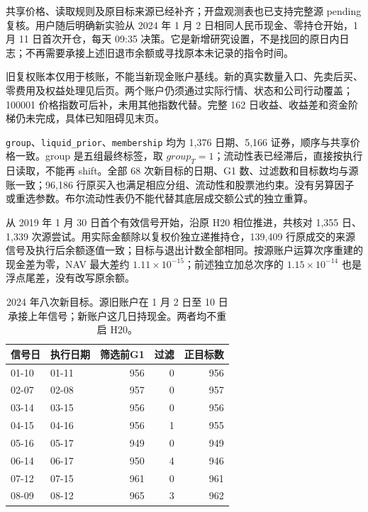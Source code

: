共享价格、读取规则及原目标来源已经补齐；开盘观测表也已支持完整源 pending 复核。用户随后明确新实验从 2024 年 1 月 2 日相同人民币现金、零持仓开始，1 月 11 日首次开仓，每天 09:35 决策。它是新增研究设置，不是找回的原日内日志；不再需要承接上述旧退市余额或寻找原本未记录的指令时间。

旧复权账本仅用于核账，不能当新现金账户基线。新的真实数量入口、先卖后买、零费用及权益处理见后页。两个账户仍须通过实际行情、状态和公司行动覆盖；100001 价格指数可后补，未用其他指数代替。完整 162 日收益、收益差和资金阶梯仍未完成，具体已知阻碍见末页。

\clearpage
{}

\texttt{group}、\texttt{liquid\_prior}、\texttt{membership} 均为 1,376 日期、5,166 证券，顺序与共享价格一致。group 是五组最终标签，取 $group_T=1$；流动性表已经滞后，直接按执行日读取，不能再 shift。全部 68 次新目标的日期、G1 数、过滤数和目标数均与源账一致；96,186 行原买入也满足相应分组、流动性和股票池约束。没有另算因子或重选参数。布尔流动性表仍不能代替其底层成交额公式的独立重算。

从 2019 年 1 月 30 日首个有效信号开始，沿原 H20 相位推进，共核对 1,355 日、1,339 次源尝试。用实际金额除以复权价独立递推持仓，139,409 行原成交的来源信号及执行后余额逐值一致；目标与退出计数全部相同。按源账户运算次序重建的现金差为零，NAV 最大差约 $1.11\times10^{-15}$；前述独立加总次序的 $1.15\times10^{-14}$ 也是浮点尾差，没有改写原余额。

\begin{table}[H]\centering\small
\begin{tabular}{llrrr}
\toprule 信号日 & 执行日期 & 筛选前G1 & 过滤 & 正目标数\\\midrule
01-10 & 01-11 & 956 & 0 & 956\\
02-07 & 02-08 & 957 & 0 & 957\\
03-14 & 03-15 & 956 & 0 & 956\\
04-15 & 04-16 & 956 & 1 & 955\\
05-16 & 05-17 & 949 & 0 & 949\\
06-14 & 06-17 & 950 & 4 & 946\\
07-12 & 07-15 & 961 & 0 & 961\\
08-09 & 08-12 & 965 & 3 & 962\\
\bottomrule
\end{tabular}
\caption{2024 年八次新目标。源旧账户在 1 月 2 日至 10 日承接上年信号；新账户这几日持现金。两者均不重启 H20。}
\end{table}

